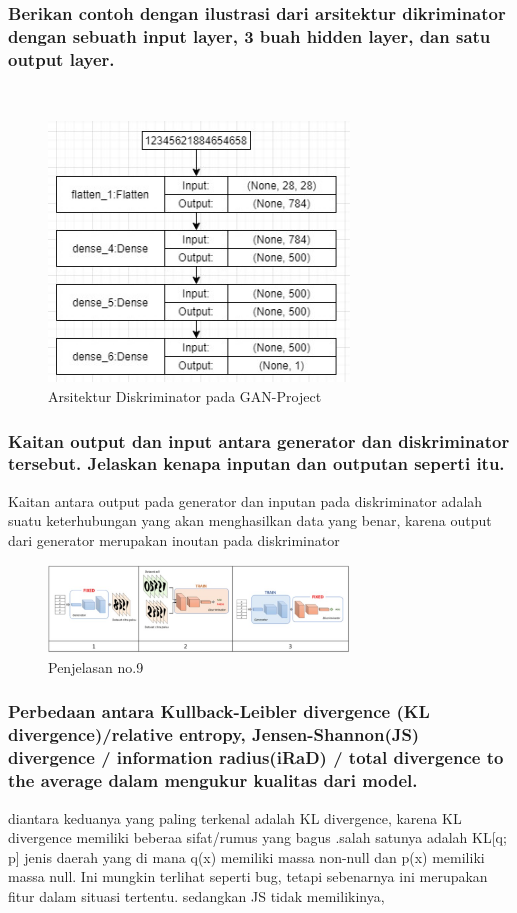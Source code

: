\subsubsection{Berikan contoh dengan ilustrasi dari arsitektur dikriminator dengan sebuath input layer, 3 buah hidden layer, dan satu output layer.}
\hfill\\
\begin{figure}[H]
	\centering
	\includegraphics[width=8cm]{figures/1174067/8/4a.jpg}
	\caption{Arsitektur Diskriminator pada GAN-Project}
\end{figure}



\subsubsection{Kaitan output dan input antara generator dan diskriminator tersebut. Jelaskan kenapa inputan dan outputan seperti itu.}
\hfill\break
Kaitan antara output pada generator dan inputan pada diskriminator adalah suatu keterhubungan yang akan menghasilkan data yang benar, karena output dari generator merupakan inoutan pada diskriminator
\begin{figure}[H]
	\centering
	\includegraphics[width=8cm]{figures/1174067/8/9.jpg}
	\caption{Penjelasan no.9}
\end{figure}

\subsubsection{Perbedaan antara Kullback-Leibler divergence (KL divergence)/relative entropy, Jensen-Shannon(JS) divergence / information radius(iRaD) / total divergence to the average dalam mengukur kualitas dari model.}
\hfill\break
diantara keduanya yang paling terkenal adalah KL divergence, karena KL divergence memiliki beberaa sifat/rumus yang bagus .salah satunya adalah KL[q; p] jenis daerah yang di mana q(x) memiliki massa non-null dan p(x) memiliki massa null. Ini mungkin terlihat seperti bug, tetapi sebenarnya ini merupakan fitur dalam situasi tertentu. sedangkan JS tidak memilikinya,

